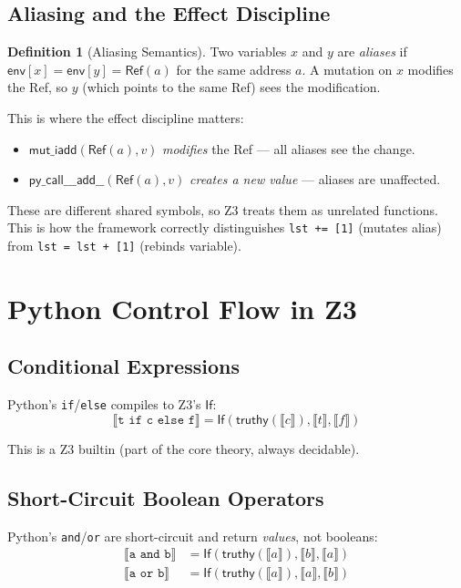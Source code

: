 \documentclass[11pt,a4paper]{report}
\theoremstyle{definition}
\newtheorem{definition}{Definition}[chapter]
\theoremstyle{plain}
\newcommand{\den}[1]{\llbracket #1 \rrbracket}
\begin{document}
\subsection{Aliasing and the Effect Discipline}

\begin{definition}[Aliasing Semantics]
Two variables $x$ and $y$ are \emph{aliases} if
$\mathsf{env}[x] = \mathsf{env}[y] = \mathsf{Ref}(a)$ for the same
address $a$.  A mutation on $x$ modifies the Ref, so $y$ (which
points to the same Ref) sees the modification.
\end{definition}

This is where the effect discipline matters:
\begin{itemize}
  \item $\mathsf{mut\_iadd}(\mathsf{Ref}(a), v)$ \emph{modifies}
    the Ref --- all aliases see the change.
  \item $\mathsf{py\_call\_\_\_add\_\_}(\mathsf{Ref}(a), v)$
    \emph{creates a new value} --- aliases are unaffected.
\end{itemize}

These are different shared symbols, so Z3 treats them as unrelated
functions.  This is how the framework correctly distinguishes
\texttt{lst += [1]} (mutates alias) from \texttt{lst = lst + [1]}
(rebinds variable).


\section{Python Control Flow in Z3}

\subsection{Conditional Expressions}

Python's \texttt{if}/\texttt{else} compiles to Z3's $\mathsf{If}$:
\[
  \den{\texttt{t if c else f}} = \mathsf{If}(\mathsf{truthy}(\den{c}),
    \den{t}, \den{f})
\]

This is a Z3 builtin (part of the core theory, always decidable).

\subsection{Short-Circuit Boolean Operators}

Python's \texttt{and}/\texttt{or} are short-circuit and return
\emph{values}, not booleans:
\begin{align}
  \den{\texttt{a and b}} &= \mathsf{If}(\mathsf{truthy}(\den{a}),
    \den{b}, \den{a}) \\
  \den{\texttt{a or b}} &= \mathsf{If}(\mathsf{truthy}(\den{a}),
    \den{a}, \den{b})
\end{align}
\end{document}
